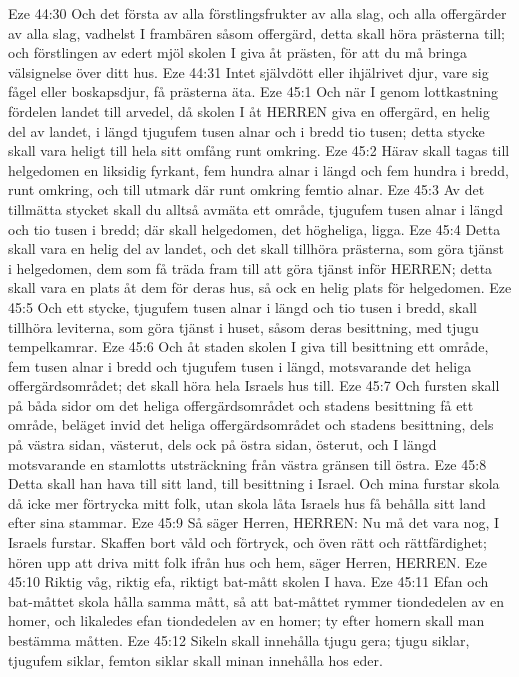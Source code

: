 Eze 44:30  Och det första av alla förstlingsfrukter av alla slag, och alla offergärder av alla slag, vadhelst I frambären såsom offergärd, detta skall höra prästerna till; och förstlingen av edert mjöl skolen I giva åt prästen, för att du må bringa välsignelse över ditt hus.
Eze 44:31  Intet självdött eller ihjälrivet djur, vare sig fågel eller boskapsdjur, få prästerna äta.
Eze 45:1  Och när I genom lottkastning fördelen landet till arvedel, då skolen I åt HERREN giva en offergärd, en helig del av landet, i längd tjugufem tusen alnar och i bredd tio tusen; detta stycke skall vara heligt till hela sitt omfång runt omkring.
Eze 45:2  Härav skall tagas till helgedomen en liksidig fyrkant, fem hundra alnar i längd och fem hundra i bredd, runt omkring, och till utmark där runt omkring femtio alnar.
Eze 45:3  Av det tillmätta stycket skall du alltså avmäta ett område, tjugufem tusen alnar i längd och tio tusen i bredd; där skall helgedomen, det högheliga, ligga.
Eze 45:4  Detta skall vara en helig del av landet, och det skall tillhöra prästerna, som göra tjänst i helgedomen, dem som få träda fram till att göra tjänst inför HERREN; detta skall vara en plats åt dem för deras hus, så ock en helig plats för helgedomen.
Eze 45:5  Och ett stycke, tjugufem tusen alnar i längd och tio tusen i bredd, skall tillhöra leviterna, som göra tjänst i huset, såsom deras besittning, med tjugu tempelkamrar.
Eze 45:6  Och åt staden skolen I giva till besittning ett område, fem tusen alnar i bredd och tjugufem tusen i längd, motsvarande det heliga offergärdsområdet; det skall höra hela Israels hus till.
Eze 45:7  Och fursten skall på båda sidor om det heliga offergärdsområdet och stadens besittning få ett område, beläget invid det heliga offergärdsområdet och stadens besittning, dels på västra sidan, västerut, dels ock på östra sidan, österut, och I längd motsvarande en stamlotts utsträckning från västra gränsen till östra.
Eze 45:8  Detta skall han hava till sitt land, till besittning i Israel. Och mina furstar skola då icke mer förtrycka mitt folk, utan skola låta Israels hus få behålla sitt land efter sina stammar.
Eze 45:9  Så säger Herren, HERREN: Nu må det vara nog, I Israels furstar. Skaffen bort våld och förtryck, och öven rätt och rättfärdighet; hören upp att driva mitt folk ifrån hus och hem, säger Herren, HERREN.
Eze 45:10  Riktig våg, riktig efa, riktigt bat-mått skolen I hava.
Eze 45:11  Efan och bat-måttet skola hålla samma mått, så att bat-måttet rymmer tiondedelen av en homer, och likaledes efan tiondedelen av en homer; ty efter homern skall man bestämma måtten.
Eze 45:12  Sikeln skall innehålla tjugu gera; tjugu siklar, tjugufem siklar, femton siklar skall minan innehålla hos eder.
